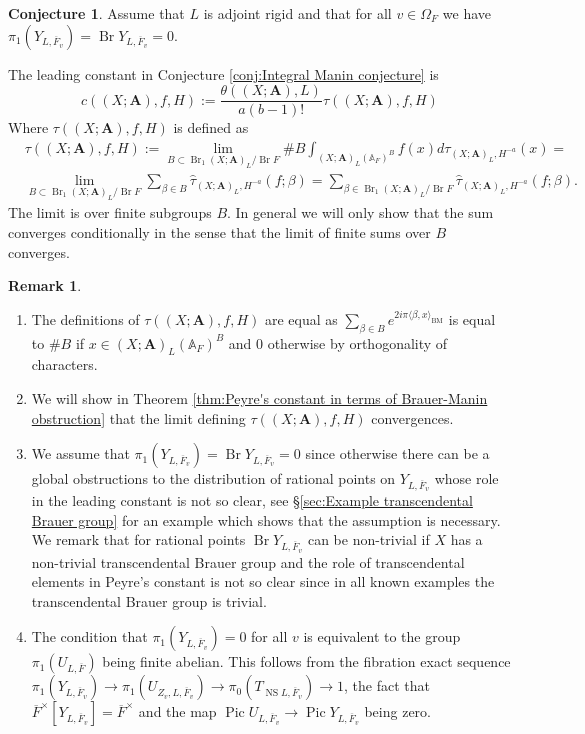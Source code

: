 \documentclass[a4paper,11pt,reqno]{amsart}
\newcommand{\A}{\mathbb{A}}
\DeclareMathOperator{\Pic}{Pic}
\DeclareMathOperator{\NS}{NS}
\DeclareMathOperator{\Br}{Br}
\theoremstyle{definition}
\newtheorem{conjecture}[theorem]{Conjecture}
\newtheorem{remark}[theorem]{Remark}
\begin{document}
\begin{conjecture} \label{conj:Leading constant}
	Assume that $L$ is adjoint rigid and that for all $v \in \Omega_F$ we have $\pi_1(Y_{L,\overline{F}_v}) = \Br Y_{L, \overline{F}_v} = 0$.
	
	The leading constant in Conjecture \ref{conj:Integral Manin conjecture} is
	\[
	c((X ; \mathbf{A}), f, H) := \frac{\theta((X ; \mathbf{A}), L)}{a (b - 1)!} \tau((X ; \mathbf{A}), f, H)
	\]
	Where $\tau((X ; \mathbf{A}), f, H)$ is defined as
	\[
	\begin{split}
		&\tau((X ; \mathbf{A}), f, H) := \lim_{B \subset \Br_1 (X; \mathbf{A})_L / \Br F} \# B \int_{(X; \mathbf{A})_L(\A_F)^B} f(x) d\tau_{(X; \mathbf{A})_L, H^{-a}}(x) =\\
		&\lim_{B \subset \Br_1 (X; \mathbf{A})_L / \Br F} \sum_{\beta \in B} \hat{\tau}_{(X; \mathbf{A})_L, H^{-a}}(f ; \beta)
		= \sum_{\beta \in \Br_1 (X; \mathbf{A})_L / \Br F} \hat{\tau}_{(X; \mathbf{A})_L, H^{-a}}(f ; \beta).
	\end{split}
	\]
	The limit is over finite subgroups $B$. In general we will only show that the sum converges conditionally in the sense that the limit of finite sums over $B$ converges.
\end{conjecture}
\begin{remark}	\hfil
	\begin{enumerate}
		\item The definitions of $\tau((X ; \mathbf{A}), f, H)$ are equal as $\sum_{\beta \in B} e^{2 i \pi \langle \beta,  x \rangle_{\text{BM}}}$ is equal to $\# B$ if $x \in (X; \mathbf{A})_L(\A_F)^B$ and $0$ otherwise by orthogonality of characters. 
		\item We will show in Theorem \ref{thm:Peyre's constant in terms of Brauer-Manin obstruction} that the limit defining $\tau((X ; \mathbf{A}), f, H)$ convergences.
		\item We assume that $\pi_1(Y_{L, \overline{F}_v}) = \Br Y_{L, \overline{F}_v} = 0$ since otherwise there can be a global obstructions to the distribution of rational points on $Y_{L, \overline{F}_v}$ whose role in the leading constant is not so clear, see \S\ref{sec:Example transcendental Brauer group} for an example which shows that the assumption is necessary. We remark that for rational points $\Br Y_{L, \overline{F}_v}$ can be non-trivial if $X$ has a non-trivial transcendental Brauer group and the role of transcendental elements in Peyre's constant is not so clear since in all known examples the transcendental Brauer group is trivial.
		\item The condition that $\pi_1(Y_{L,\overline{F}_v}) = 0$ for all $v$ is equivalent to the group  $\pi_1(U_{L,\overline{F}})$ being finite abelian. This follows from the fibration exact sequence $\pi_1(Y_{L, \overline{F}_v}) \to \pi_1(U_{Z_v, L, \overline{F}_v}) \to \pi_0(T_{\NS L, \overline{F}_v}) \to 1$, the fact that $\overline{F}^{\times}[Y_{L, \overline{F}_v}] = \overline{F}^{\times}$ and the map $\Pic U_{L, \overline{F}_v} \to \Pic Y_{L, \overline{F}_v}$ being zero. 
	\end{enumerate}
\end{remark}
\end{document}
